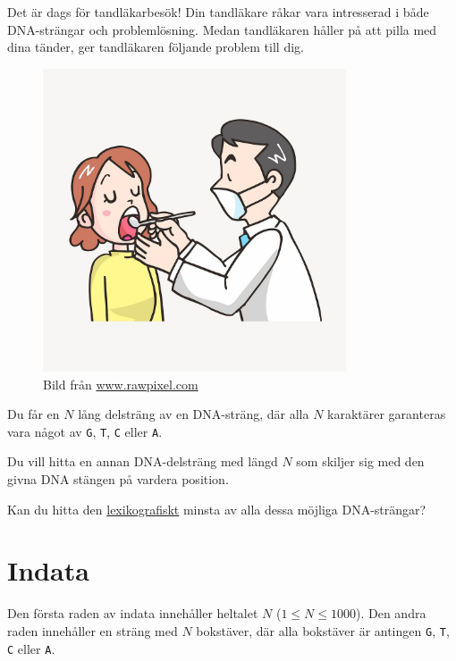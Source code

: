 \noindent
Det är dags för tandläkarbesök! Din tandläkare råkar vara intresserad i både DNA-strängar och problemlösning. 
Medan tandläkaren håller på att pilla med dina tänder, ger tandläkaren följande problem till dig.

\begin{centering}
    \begin{figure}[h]
        \centering
        \includegraphics[width=0.8\textwidth]{gapastort.jpg}
        \caption{Bild från \href{https://www.rawpixel.com/image/7661670/vector-cartoon-illustrations-public-domain}{www.rawpixel.com}}
    \end{figure}
\end{centering}
  




Du får en $N$ lång delsträng av en DNA-sträng, där alla $N$ karaktärer garanteras vara något av \texttt{G}, \texttt{T}, \texttt{C} eller \texttt{A}.

Du vill hitta en annan DNA-delsträng med längd $N$ som skiljer sig med den givna DNA stängen på vardera position.

Kan du hitta den \href{https://en.wikipedia.org/wiki/Lexicographic_order}{lexikografiskt} minsta av alla dessa möjliga DNA-strängar? 



\section*{Indata}
\noindent
Den första raden av indata innehåller heltalet $N$ ($1 \leq N \leq 1000$).
\noindent
Den andra raden innehåller en sträng med $N$ bokstäver, där alla bokstäver är antingen \texttt{G}, \texttt{T}, \texttt{C} eller \texttt{A}.

